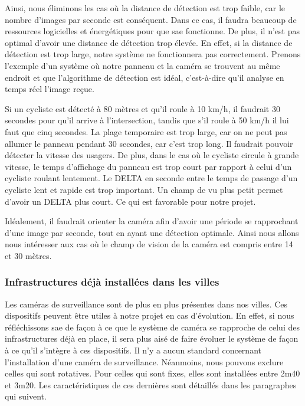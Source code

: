 Ainsi, nous éliminons les cas où la distance de détection est trop faible, car le nombre d'images par seconde est conséquent.
Dans ce cas, il faudra beaucoup de ressources logicielles et énergétiques pour que \gls{sae} fonctionne.
De plus, il n'est pas optimal d'avoir une distance de détection trop élevée.
En effet, si la distance de détection est trop large, notre système ne fonctionnera pas correctement.
Prenons l'exemple d'un système où notre panneau et la caméra se trouvent au même endroit et que l'algorithme de détection est idéal,
c'est-à-dire qu'il analyse en temps réel l'image reçue.
\begin{example}
    Si un cycliste est détecté à 80 mètres et qu'il roule à 10 km/h, il faudrait 30 secondes pour qu'il arrive à l'intersection,
    tandis que s'il roule à 50 km/h il lui faut que cinq secondes. La plage temporaire est trop large,
    car on ne peut pas allumer le panneau pendant 30 secondes, car c'est trop long. Il faudrait pouvoir détecter la vitesse des usagers.
    De plus, dans le cas où le cycliste circule à grande vitesse, le temps d'affichage du panneau est trop court par rapport à celui d'un cycliste roulant lentement.
    Le DELTA en seconde entre le temps de passage d'un cycliste lent et rapide est trop important. 
    Un champ de vu plus petit permet d'avoir un DELTA plus court. Ce qui est favorable pour notre projet.
\end{example}


Idéalement, il faudrait orienter la caméra afin d'avoir une période se rapprochant d'une image par seconde, tout en ayant une détection optimale.
Ainsi nous allons nous intéresser aux cas où le champ de vision de la caméra est compris entre 14 et 30 mètres.

\subsubsection{Infrastructures déjà installées dans les villes}
\label{sec:camera_infra}
Les caméras de surveillance sont de plus en plus présentes dans nos villes. Ces dispositifs peuvent être utiles à notre projet en cas d'évolution.
En effet, si nous réfléchissons \gls{sae} de façon à ce que le système de caméra se rapproche de celui des infrastructures déjà en place,
il sera plus aisé de faire évoluer le système de façon à ce qu'il s'intègre à ces dispositifs.
Il n'y a aucun standard concernant l'installation d'une caméra de surveillance. Néanmoins, nous pouvons exclure celles qui sont rotatives.
Pour celles qui sont fixes, elles sont installées entre 2m40 et 3m20. Les caractéristiques de ces dernières sont détaillés dans les paragraphes qui suivent.

